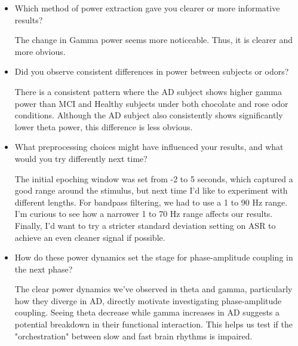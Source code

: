 \documentclass[hidelinks,12pt]{article}
\begin{document}
	\begin{itemize}
		\item Which method of power extraction gave you clearer or more informative results?
		
		The change in Gamma power seems more noticeable. Thus, it is clearer and more obvious.
		
		\item Did you observe consistent differences in power between subjects or odors?
		
		There is a consistent pattern where the AD subject shows higher gamma power than MCI and Healthy subjects under both chocolate and rose odor conditions. Although the AD subject also consistently shows significantly lower theta power, this difference is less obvious.
		
		\item What preprocessing choices might have influenced your results, and what would you try differently next time?
		
		The initial epoching window was set from -2 to 5 seconds, which captured a good range around the stimulus, but next time I'd like to experiment with different lengths. For bandpass filtering, we had to use a 1 to 90 Hz range. I'm curious to see how a narrower 1 to 70 Hz range affects our results. Finally, I'd want to try a stricter standard deviation setting on ASR to achieve an even cleaner signal if possible.
		
		\newpage
		
		
		\item How do these power dynamics set the stage for phase-amplitude coupling in the next phase?
		
		The clear power dynamics we've observed in theta and gamma, particularly how they diverge in AD, directly motivate investigating phase-amplitude coupling. Seeing theta decrease while gamma increases in AD suggests a potential breakdown in their functional interaction. This helps us test if the "orchestration" between slow and fast brain rhythms is impaired.
		
	\end{itemize}
	
	
	
\end{document}
